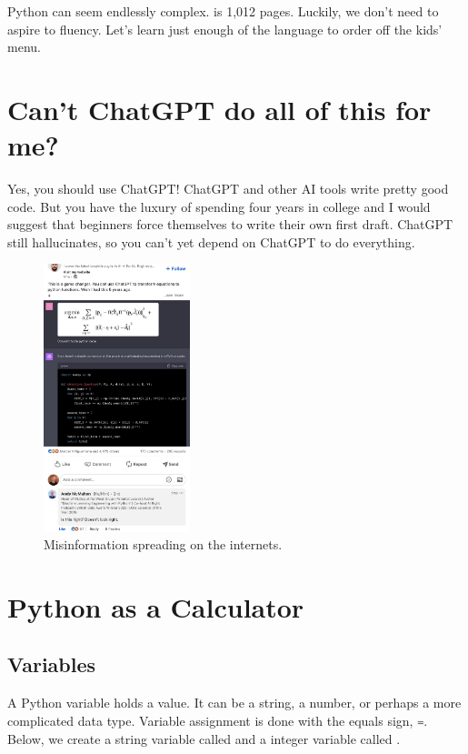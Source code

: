 \documentclass{article}
\begin{document}
Python can seem endlessly complex.  is 1,012 pages. Luckily, we don't need to aspire to fluency. Let's learn just enough of the language to order off the kids' menu. 

\section{Can't ChatGPT do all of this for me?}

Yes, you should use ChatGPT! ChatGPT and other AI tools write pretty good code. But you have the luxury of spending four years in college and I would suggest that beginners force themselves to write their own first draft. ChatGPT still hallucinates, so you can't yet depend on ChatGPT to do everything.

\begin{figure}[h!]
\centering
\includegraphics[width=0.38\textwidth]{figures/chatgptwrong}
\caption{Misinformation spreading on the internets.}
\label{fig:your_label}
\end{figure}



\section{Python as a Calculator}

\subsection{Variables}

A Python variable holds a value. It can be a string, a number, or perhaps a more complicated data type. Variable assignment is done with the equals sign, \lstinline[language = Python]{=}. Below, we create a string variable called  and a integer variable called . 
\end{document}
